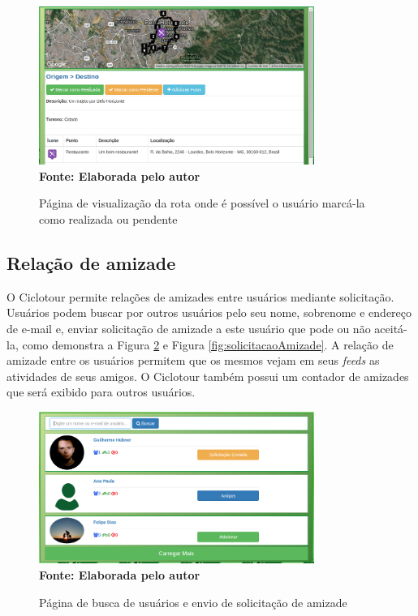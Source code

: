 \begin{figure}[!ht]
	\centering	
	\caption[\hspace{0.1cm} Marcar rotas como realizadas ou pendentes.]
	{Página de visualização da rota onde é possível o usuário marcá-la como realizada ou pendente}
	  \vspace{-0.4cm}
	\includegraphics[width=0.8\textwidth]{figuras/marcarRota.png}
	 \vspace{0cm}
	\\\textbf{\footnotesize Fonte: Elaborada pelo autor}
	\label{fig:marcarRota}
\end{figure}

\subsection{Relação de amizade}

O Ciclotour permite relações de amizades entre usuários mediante solicitação. Usuários podem buscar por outros usuários pelo seu nome, 
sobrenome e 
endereço de e-mail e, enviar solicitação de amizade a este usuário que pode ou não aceitá-la, como demonstra a Figura \ref{fig:buscarUsuario} e 
Figura \ref{fig:solicitacaoAmizade}. A relação de amizade entre os usuários permitem que os mesmos vejam em seus \textit{feeds} as atividades de seus 
amigos. O Ciclotour também possui um contador de amizades que será exibido para outros usuários.

\begin{figure}[!ht]
	\centering	
	\caption[\hspace{0.1cm} Buscar usuários.]
	{Página de busca de usuários e envio de solicitação de amizade}
	  \vspace{-0.4cm}
	\includegraphics[width=0.8\textwidth]{figuras/buscarUsuario.png}
	 \vspace{0cm}
	\\\textbf{\footnotesize Fonte: Elaborada pelo autor}
	\label{fig:buscarUsuario}
\end{figure}

